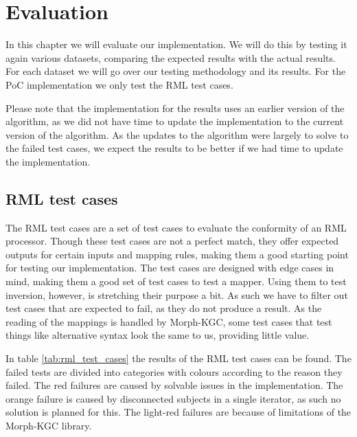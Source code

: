 \chapter{Evaluation}
\label{chapter:evaluation}
In this chapter we will evaluate our implementation. We will do this by testing it again various datasets, comparing the expected results with the actual results. For each dataset we will go over our testing methodology and its results. For the PoC implementation we only test the RML test cases. 

Please note that the implementation for the results uses an earlier version of the algorithm, as we did not have time to update the implementation to the current version of the algorithm. As the updates to the algorithm were largely to solve to the failed test cases, we expect the results to be better if we had time to update the implementation.

\section{RML test cases}
\label{section:rml_test_cases}
The RML test cases are a set of test cases to evaluate the conformity of an RML processor. Though these test cases are not a perfect match, they offer expected outputs for certain inputs and mapping rules, making them a good starting point for testing our implementation. The test cases are designed with edge cases in mind, making them a good set of test cases to test a mapper. Using them to test inversion, however, is stretching their purpose a bit. As such we have to filter out test cases that are expected to fail, as they do not produce a result. As the reading of the mappings is handled by Morph-KGC, some test cases that test things like alternative syntax look the same to us, providing little value.

In table \ref{tab:rml_test_cases} the results of the RML test cases can be found. The failed tests are divided into categories with colours according to the reason they failed. The red failures are caused by solvable issues in the implementation. The orange failure is caused by disconnected subjects in a single iterator, as such no solution is planned for this. The light-red failures are because of limitations of the Morph-KGC library. 

